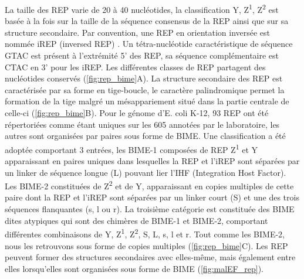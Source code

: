 \documentclass[12pt,a4paper]{report}
\begin{document}
\begin{onehalfspace}
La taille des REP varie de 20 à 40 nucléotides, la classification Y, Z\textsuperscript{1}, Z\textsuperscript{2} est basée à la fois sur la taille de la séquence consensus de la REP ainsi que sur sa structure secondaire. Par convention, une REP en orientation inversée est nommée iREP (inversed REP) \citep{Ton-Hoang2012}. Un tétra-nucléotide caractéristique de séquence GTAC est présent à l'extrémité 5' des REP, sa séquence complémentaire est CTAC en 3' pour les iREP. Les différentes classes de REP partagent des nucléotides conservés (\autoref{fig:rep_bime}A). La structure secondaire des REP est caractérisée par sa forme en tige-boucle, le caractère palindromique permet la formation de la tige malgré un mésappariement situé dans la partie centrale de celle-ci (\autoref{fig:rep_bime}B). Pour le génome d'E. coli K-12, 93 REP ont été répertoriées comme étant uniques sur les 605 annotées par le laboratoire, les autres sont organisées par paires sous forme de BIME. Une classification a été adoptée comportant 3 entrées, les BIME-1 composées de REP Z\textsuperscript{1} et Y apparaissant en paires uniques dans lesquelles la REP et l'iREP sont séparées par un linker de séquence longue (L) pouvant lier l'IHF (Integration Host Factor). Les BIME-2 constituées de Z\textsuperscript{2} et de Y, apparaissant en copies multiples de cette paire dont la REP et l'iREP sont séparées par un linker court (S) et une des trois séquences flanquantes (s, l ou r). La troisième catégorie est constituée des BIME dites atypiques qui sont des chimères de BIME-1 et BIME-2, comportant différentes combinaisons de Y, Z\textsuperscript{1}, Z\textsuperscript{2}, S, L, s, l et r. Tout comme les BIME-2, nous les retrouvons sous forme de copies multiples (\autoref{fig:rep_bime}C). Les REP peuvent former des structures secondaires avec elles-même, mais également entre elles lorsqu'elles sont organisées sous forme de BIME (\autoref{fig:malEF_rep}).


\end{onehalfspace}
\end{document}
